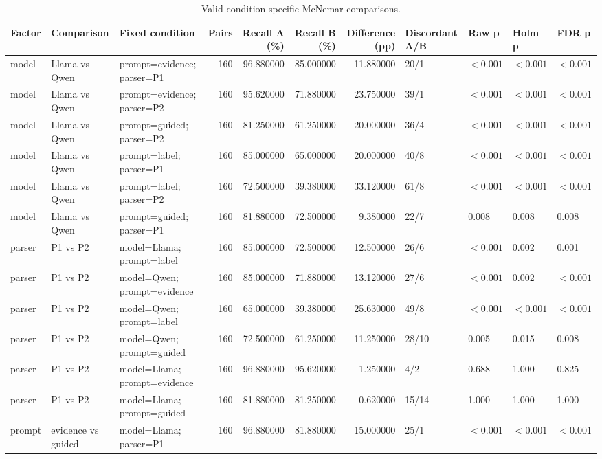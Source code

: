 \begin{table}[t]
\caption{Valid condition-specific McNemar comparisons.}
\label{tab:mcnemar_selected}
\begin{tabular}{lllrrrrllll}
\toprule
Factor & Comparison & Fixed condition & Pairs & Recall A (\%) & Recall B (\%) & Difference (pp) & Discordant A/B & Raw p & Holm p & FDR p \\
\midrule
model & Llama vs Qwen & prompt=evidence; parser=P1 & 160 & 96.880000 & 85.000000 & 11.880000 & 20/1 & $<0.001$ & $<0.001$ & $<0.001$ \\
model & Llama vs Qwen & prompt=evidence; parser=P2 & 160 & 95.620000 & 71.880000 & 23.750000 & 39/1 & $<0.001$ & $<0.001$ & $<0.001$ \\
model & Llama vs Qwen & prompt=guided; parser=P2 & 160 & 81.250000 & 61.250000 & 20.000000 & 36/4 & $<0.001$ & $<0.001$ & $<0.001$ \\
model & Llama vs Qwen & prompt=label; parser=P1 & 160 & 85.000000 & 65.000000 & 20.000000 & 40/8 & $<0.001$ & $<0.001$ & $<0.001$ \\
model & Llama vs Qwen & prompt=label; parser=P2 & 160 & 72.500000 & 39.380000 & 33.120000 & 61/8 & $<0.001$ & $<0.001$ & $<0.001$ \\
model & Llama vs Qwen & prompt=guided; parser=P1 & 160 & 81.880000 & 72.500000 & 9.380000 & 22/7 & 0.008 & 0.008 & 0.008 \\
parser & P1 vs P2 & model=Llama; prompt=label & 160 & 85.000000 & 72.500000 & 12.500000 & 26/6 & $<0.001$ & 0.002 & 0.001 \\
parser & P1 vs P2 & model=Qwen; prompt=evidence & 160 & 85.000000 & 71.880000 & 13.120000 & 27/6 & $<0.001$ & 0.002 & $<0.001$ \\
parser & P1 vs P2 & model=Qwen; prompt=label & 160 & 65.000000 & 39.380000 & 25.630000 & 49/8 & $<0.001$ & $<0.001$ & $<0.001$ \\
parser & P1 vs P2 & model=Qwen; prompt=guided & 160 & 72.500000 & 61.250000 & 11.250000 & 28/10 & 0.005 & 0.015 & 0.008 \\
parser & P1 vs P2 & model=Llama; prompt=evidence & 160 & 96.880000 & 95.620000 & 1.250000 & 4/2 & 0.688 & 1.000 & 0.825 \\
parser & P1 vs P2 & model=Llama; prompt=guided & 160 & 81.880000 & 81.250000 & 0.620000 & 15/14 & 1.000 & 1.000 & 1.000 \\
prompt & evidence vs guided & model=Llama; parser=P1 & 160 & 96.880000 & 81.880000 & 15.000000 & 25/1 & $<0.001$ & $<0.001$ & $<0.001$ \\

\end{tabular}
\end{table}
